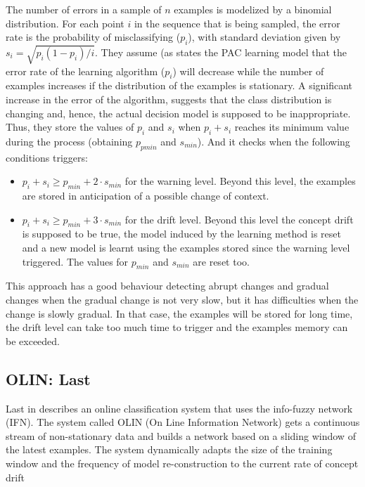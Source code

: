The number of errors in a sample of $n$ examples is modelized by a binomial distribution. For each point $i$ in the sequence
that is being sampled, the error rate is the probability of misclassifying ($p_i$),
with standard deviation given by $s_i = \sqrt{p_i(1 - p_i)/i}$. They assume (as states the
PAC learning model \cite{Mitchell} that the error rate of the learning algorithm ($p_i$) will
decrease while the number of examples increases if the distribution of the examples is stationary. A significant increase in the error of the algorithm, suggests
that the class distribution is changing and, hence, the actual decision model is
supposed to be inappropriate. Thus, they store the values of $p_i$ and $s_i$ when
$p_i+s_i$ reaches its minimum value during the process (obtaining $p_{pmin}$ and $s_{min}$).
And it checks when the following conditions triggers:
\begin{itemize}
\item $p_i + s_i \geq p_{min} + 2 \cdot s_{min}$ for the warning level. Beyond this level, the examples are stored in anticipation of a possible change of context.

\item $p_i + s_i \geq p_{min} + 3 \cdot s_{min}$ for the drift level. Beyond this level the concept drift is supposed to be true, the model induced by the learning method is reset and a new model is learnt using the examples stored since the warning level triggered. The values for $p_{min}$ and $s_{min}$ are reset too.

\end{itemize}

This approach has a good behaviour detecting abrupt changes and gradual
changes when the gradual change is not very slow, but it has difficulties when
the change is slowly gradual. In that case, the examples will be stored for long
time, the drift level can take too much time to trigger and the examples memory
can be exceeded.
\ENDOMIT


\subsection{OLIN: Last}
Last in \cite{olin} describes an online classification system that uses the info-fuzzy network (IFN). %
The system called OLIN (On Line Information Network) gets a continuous stream of non-stationary data and builds a network based on %
a sliding window of the latest examples.
The system dynamically adapts the size of the training
window and the frequency of model re-construction to the current rate of concept drift

